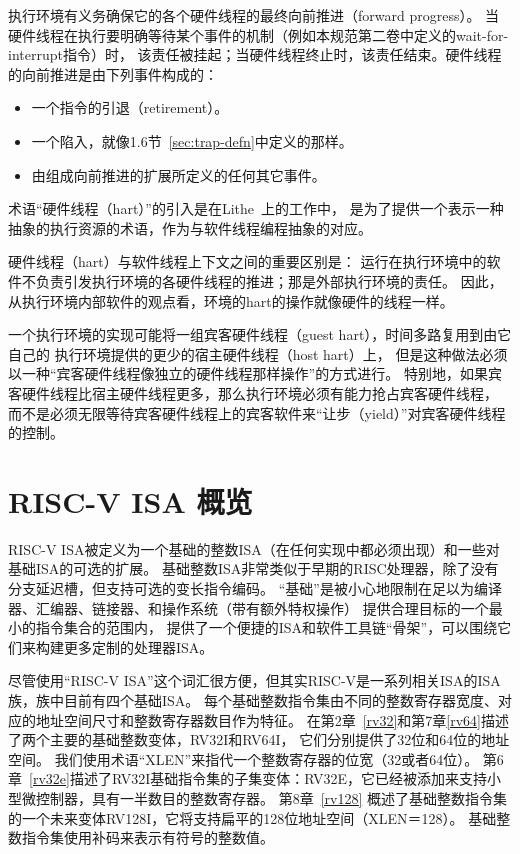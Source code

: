 执行环境有义务确保它的各个硬件线程的最终向前推进（forward progress）。
当硬件线程在执行要明确等待某个事件的机制（例如本规范第二卷中定义的wait-for-interrupt指令）时，
该责任被挂起；当硬件线程终止时，该责任结束。硬件线程的向前推进是由下列事件构成的：

\vspace{-0.2in}
\begin{itemize}
\parskip 0pt
\itemsep 1pt
\item 一个指令的引退（retirement）。
\item 一个陷入，就像1.6节~\ref{sec:trap-defn}中定义的那样。
\item 由组成向前推进的扩展所定义的任何其它事件。
\end{itemize}

\begin{commentary}

术语“硬件线程（hart）”的引入是在Lithe~\cite{lithe-pan-hotpar09,lithe-pan-pldi10}上的工作中，
是为了提供一个表示一种抽象的执行资源的术语，作为与软件线程编程抽象的对应。

硬件线程（hart）与软件线程上下文之间的重要区别是：
运行在执行环境中的软件不负责引发执行环境的各硬件线程的推进；那是外部执行环境的责任。
因此，从执行环境内部软件的观点看，环境的hart的操作就像硬件的线程一样。

一个执行环境的实现可能将一组宾客硬件线程（guest hart），时间多路复用到由它自己的
执行环境提供的更少的宿主硬件线程（host hart）上，
但是这种做法必须以一种“宾客硬件线程像独立的硬件线程那样操作”的方式进行。
特别地，如果宾客硬件线程比宿主硬件线程更多，那么执行环境必须有能力抢占宾客硬件线程，
而不是必须无限等待宾客硬件线程上的宾客软件来“让步（yield）”对宾客硬件线程的控制。

\end{commentary}

\section{RISC-V ISA 概览}

RISC-V ISA被定义为一个基础的整数ISA（在任何实现中都必须出现）和一些对基础ISA的可选的扩展。
基础整数ISA非常类似于早期的RISC处理器，除了没有分支延迟槽，但支持可选的变长指令编码。
“基础”是被小心地限制在足以为编译器、汇编器、链接器、和操作系统（带有额外特权操作）
提供合理目标的一个最小的指令集合的范围内，
提供了一个便捷的ISA和软件工具链“骨架”，可以围绕它们来构建更多定制的处理器ISA。

尽管使用“RISC-V ISA”这个词汇很方便，但其实RISC-V是一系列相关ISA的ISA族，族中目前有四个基础ISA。
每个基础整数指令集由不同的整数寄存器宽度、对应的地址空间尺寸和整数寄存器数目作为特征。
在第2章~\ref{rv32}和第7章\ref{rv64}描述了两个主要的基础整数变体，RV32I和RV64I，
它们分别提供了32位和64位的地址空间。
我们使用术语“XLEN”来指代一个整数寄存器的位宽（32或者64位）。
第6章~\ref{rv32e}描述了RV32I基础指令集的子集变体：RV32E，它已经被添加来支持小型微控制器，具有一半数目的整数寄存器。
第8章~\ref{rv128} 概述了基础整数指令集的一个未来变体RV128I，它将支持扁平的128位地址空间（XLEN＝128）。
基础整数指令集使用补码来表示有符号的整数值。

